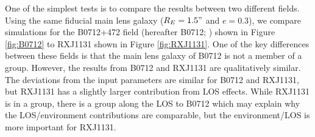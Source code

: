 One of the simplest tests is to compare the results between two different fields. Using the same fiducial main lens galaxy ($R_E = 1.5"$ and $e=0.3$), we compare simulations for the B0712+472 field (hereafter B0712; \citealt{Jackson98}) shown in Figure \ref{fig:B0712} to RXJ1131 shown in Figure \ref{fig:RXJ1131}. One of the key differences between these fields is that the main lens galaxy of B0712 is not a member of a group. However, the results from B0712 and RXJ1131 are qualitatively similar. The deviations from the input parameters are similar for B0712 and RXJ1131, but RXJ1131 has a slightly larger contribution from LOS effects. While RXJ1131 is in a group, there is a group along the LOS to B0712 which may explain why the LOS/environment contributions are comparable, but the environment/LOS is more important for RXJ1131.
  